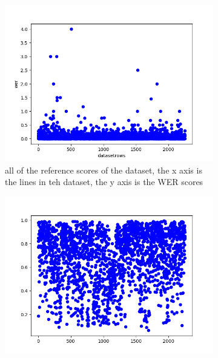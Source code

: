 \begin{figure}[ht]
    \centering
    \begin{subfigure}{0.7\textwidth}
    \includegraphics[width=\linewidth]{Latex/sections/images/werref.png}
    \caption{all of the reference scores of the dataset, the x axis is the lines in teh dataset, the y axis is the WER scores}
    \end{subfigure}
    \begin{subfigure}{0.7\textwidth}
        \includegraphics[width=\linewidth]{code/references.png}
    \end{subfigure}
    \label{fig:reference scatterplot}
\end{figure}


